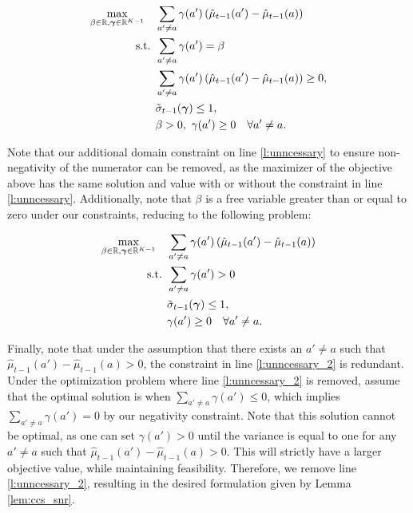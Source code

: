 \documentclass{article}
\begin{document}
\begin{appendices}
\begin{align}
    \max_{\beta \in \mathbb{R}, \boldsymbol{\gamma} \in \mathbb{R}^{K-1}} \quad& \sum_{a' \neq a}\gamma(a')\left(\hat\mu_{t-1}(a') - \hat\mu_{t-1}(a) \right)\\
    \text{s.t. } 
    & \sum_{a' \neq a} \gamma(a') = \beta  \\
    & \sum_{a' \neq a}\gamma(a')\left(\hat\mu_{t-1}(a') - \hat\mu_{t-1}(a) \right) \geq 0, \label{l:unncessary}\\
    & \tilde{\sigma}_{t-1}(\boldsymbol{\gamma}) \leq 1, \\ 
    & \beta >0, \ \gamma(a') \geq 0 \quad \forall a' \neq a.
\end{align}

Note that our additional domain constraint on line \eqref{l:unncessary} to ensure non-negativity of the numerator can be removed, as the maximizer of the objective above has the same solution and value with or without the constraint in line \eqref{l:unncessary}. Additionally, note that $\beta$ is a free variable greater than or equal to zero under our constraints, reducing to the following problem:

\begin{align}
    \max_{\beta \in \mathbb{R}, \boldsymbol{\gamma} \in \mathbb{R}^{K-1}} \quad& \sum_{a' \neq a}\gamma(a')\left(\hat\mu_{t-1}(a') - \hat\mu_{t-1}(a) \right)\\
    \text{s.t. } 
    & \sum_{a' \neq a} \gamma(a') > 0 \label{l:unncessary_2} \\
    & \tilde{\sigma}_{t-1}(\boldsymbol{\gamma}) \leq 1, \\ 
    & \gamma(a') \geq 0 \quad \forall a' \neq a.
\end{align}

Finally, note that under the assumption that there exists an $a' \neq a$ such that $\hat\mu_{t-1}(a') - \hat\mu_{t-1}(a) > 0$, the constraint in line \eqref{l:unncessary_2} is redundant. Under the optimization problem where line \eqref{l:unncessary_2} is removed, assume that the optimal solution is when $\sum_{a' \neq a}\gamma(a') \leq 0$, which implies $\sum_{a' \neq a}\gamma(a') = 0$ by our negativity constraint. Note that this solution cannot be optimal, as one can set $\gamma(a') > 0$ until the variance is equal to one for any $a' \neq a$ such that $\hat\mu_{t-1}(a') - \hat\mu_{t-1}(a) > 0$.  This will strictly have a larger objective value, while maintaining feasibility. Therefore, we remove line \eqref{l:unncessary_2}, resulting in the desired formulation given by Lemma \ref{lem:ccs_snr}. 





\end{appendices}
\end{document}
